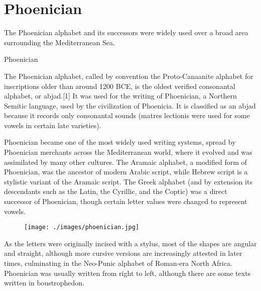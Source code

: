 \section{Phoenician}
\label{s:phoenician}
\arial

The Phoenician alphabet and its successors were widely used over a broad area surrounding the Mediterranean Sea.

\let\phoenician\lycian

\begin{scriptexample}[]{Phoenician}


\end{scriptexample}

The Phoenician alphabet, called by convention the Proto-Canaanite alphabet for inscriptions older than around 1200 BCE, is the oldest verified consonantal alphabet, or abjad.[1] It was used for the writing of Phoenician, a Northern Semitic language, used by the civilization of Phoenicia. It is classified as an abjad because it records only consonantal sounds (matres lectionis were used for some vowels in certain late varieties).

Phoenician became one of the most widely used writing systems, spread by Phoenician merchants across the Mediterranean world, where it evolved and was assimilated by many other cultures. The Aramaic alphabet, a modified form of Phoenician, was the ancestor of modern Arabic script, while Hebrew script is a stylistic variant of the Aramaic script. The Greek alphabet (and by extension its descendants such as the Latin, the Cyrillic, and the Coptic) was a direct successor of Phoenician, though certain letter values were changed to represent vowels.

\begin{figure}[ht]
\texttt{[image: ./images/phoenician.jpg]}
\end{figure}

As the letters were originally incised with a stylus, most of the shapes are angular and straight, although more cursive versions are increasingly attested in later times, culminating in the Neo-Punic alphabet of Roman-era North Africa. Phoenician was usually written from right to left, although there are some texts written in boustrophedon.


\PrintUnicodeBlock{./languages/phoenician.txt}{\phoenician}





